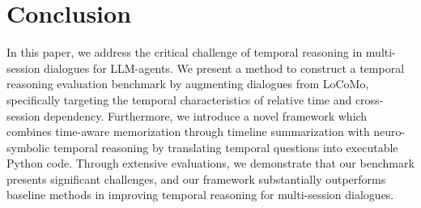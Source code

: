 \section{Conclusion}
In this paper, we address the critical challenge of temporal reasoning in multi-session dialogues for LLM-agents. We present a method to construct a temporal reasoning evaluation benchmark by augmenting dialogues from LoCoMo, specifically targeting the temporal characteristics of relative time and cross-session dependency. Furthermore, we introduce a novel framework which combines time-aware memorization through timeline summarization with neuro-symbolic temporal reasoning by translating temporal questions into executable Python code. 
Through extensive evaluations, we demonstrate that our benchmark presents significant challenges, and our framework substantially outperforms baseline methods in improving temporal reasoning for multi-session dialogues.
